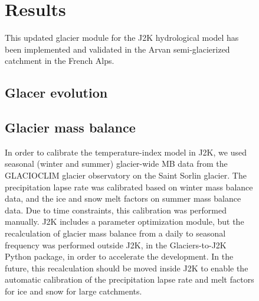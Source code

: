 \begin{figure}[h]
\section{Results}

This updated glacier module for the J2K hydrological model has been implemented and validated in the Arvan semi-glacierized catchment in the French Alps.

\subsection{Glacer evolution}

\subsection{Glacier mass balance}

In order to calibrate the temperature-index model in J2K, we used seasonal (winter and summer) glacier-wide MB data from the GLACIOCLIM glacier observatory on the Saint Sorlin glacier. The precipitation lapse rate was calibrated based on winter mass balance data, and the ice and snow melt factors on summer mass balance data. Due to time constraints, this calibration was performed manually. J2K includes a parameter optimization module, but the recalculation of glacier mass balance from a daily to seasonal frequency was performed outside J2K, in the Glaciers-to-J2K Python package, in order to accelerate the development. In the future, this recalculation should be moved inside J2K to enable the automatic calibration of the precipitation lapse rate and melt factors for ice and snow for large catchments. 


\end{figure}
